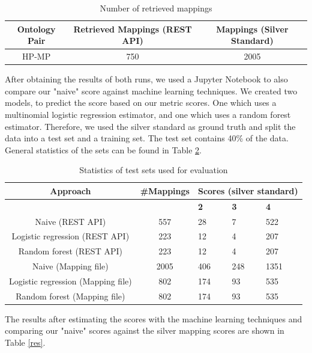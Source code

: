 \documentclass[runningheads]{llncs}
\begin{document}
\begin{table}[H]
\centering
\caption{Number of retrieved mappings}\label{maps}
\begin{tabular}{|c|c|c|}
\hline
    \textbf{Ontology Pair}&
    \textbf{Retrieved Mappings (REST API)}&
    \textbf{Mappings (Silver Standard)}
\\
\hline
 HP-MP & 750 & 2005 \\
 \hline
\end{tabular}
\end{table}
After obtaining the results of both runs, we used a Jupyter Notebook to also compare our "naive" score against machine learning techniques.  We created two models, to predict the score based on our metric scores. One which uses a multinomial logistic regression estimator, and one which uses a random forest estimator. Therefore, we used the silver standard as ground truth and split the data into a test set and a training set. The test set contains 40\% of the data. General statistics of the sets can be found in Table \ref{ml}.
\begin{table}[H]
\centering
\caption{Statistics of test sets used for evaluation}\label{ml}
\begin{tabular}{|c|c|p{1.5cm}|p{1.5cm}|p{1.5cm}|}
\hline
    \textbf{Approach}&
    \textbf{\#Mappings}&
    \multicolumn{3}{|c|}{\textbf{Scores (silver standard)}}\\
    \hline
    & & \hfil \textbf{2} & \hfil \textbf{3} & \hfil \textbf{4}\\
    \hline
    Naive (REST API) & 557 & \hfil 28 & \hfil 7 & \hfil 522\\
    \hline
    Logistic regression (REST API) & 223 & \hfil 12 & \hfil 4 & \hfil 207\\
    \hline
    Random forest (REST API) & 223 & \hfil 12 & \hfil 4 & \hfil 207\\
    \hline
    Naive (Mapping file) & 2005 & \hfil 406 & \hfil 248 & \hfil 1351\\
    \hline
    Logistic regression (Mapping file) & 802 & \hfil 174 & \hfil 93 & \hfil 535\\
    \hline
    Random forest (Mapping file) & 802 & \hfil 174 & \hfil 93 & \hfil 535\\
    \hline

\end{tabular}
\end{table}

The results after estimating the scores with the machine learning techniques and comparing our "naive" scores against the silver mapping scores are shown in Table \ref{res}.
\end{document}
